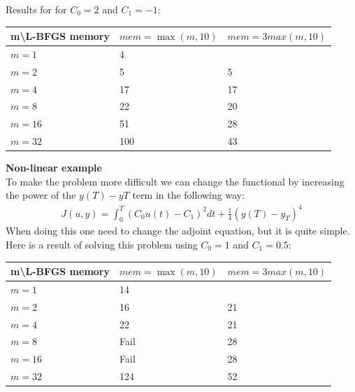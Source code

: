 \documentclass[11pt,a4paper]{article}
\begin{document}
Results for for $C_0=2 $ and $C_1= -1$:
\begin{center}
    \begin{tabular}{| l | l | l |}
    \hline
    m\textbackslash L-BFGS memory & $mem =\max(m,10)$& $mem=3max(m,10)$\\ \hline
    $m=1$  &  4 &  \\ \hline
    $m=2$  &  5 &  5	\\ \hline
    $m=4$ &  17 & 17 \\ \hline
    $m=8$ &  22 &  20	\\ \hline
    $m=16$ &  51 & 28 \\ \hline
    $m=32$ &  100 &  43	\\ \hline
    \end{tabular}
\end{center}
\textbf{Non-linear example}
\\
To make the problem more difficult we can change the functional by increasing the power of the $y(T)-yT$ term in the following way:
\begin{align*}
J(u,y) = \int_0^T (C_0u(t)-C_1)^2dt + \frac{1}{4}(y(T)-y_T)^4
\end{align*}
When doing this one need to change the adjoint equation, but it is quite simple. Here is a result of solving this problem using $C_0=1 $ and $C_1= 0.5$:
\begin{center}
    \begin{tabular}{| l | l | l |}
    \hline
    m\textbackslash L-BFGS memory & $mem =\max(m,10)$& $mem=3max(m,10)$\\ \hline
    $m=1$  &  14 &  \\ \hline
    $m=2$  &  16 & 21 	\\ \hline
    $m=4$ &  22 & 21 \\ \hline
    $m=8$ &  Fail &  28	\\ \hline
    $m=16$ &  Fail & 28 \\ \hline
    $m=32$ &  124 &  52	\\ \hline
    \end{tabular}
\end{center}
\end{document}
